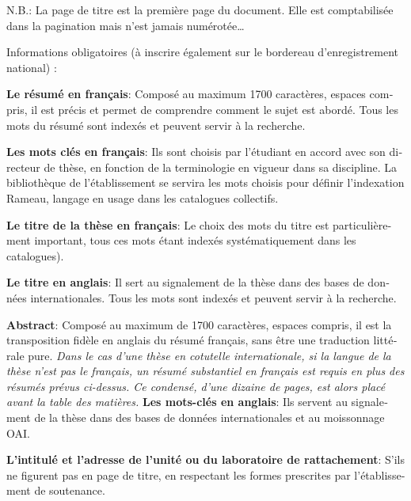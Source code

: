 \begin{otherlanguage}{french}
N.B.: La page de titre est la première page du document. 
Elle est comptabilisée dans la pagination mais n'est jamais numérotée\ldots


Informations obligatoires (à inscrire également sur le bordereau d’enregistrement national) :


\textbf{Le résumé en français}: Composé au maximum 1700 caractères, espaces compris, il est précis et permet de comprendre comment le sujet est abordé. Tous les mots du résumé sont indexés et peuvent servir à la recherche.

\textbf{Les mots clés en français}: Ils sont choisis par l’étudiant en accord avec son directeur de thèse, en fonction de la terminologie en vigueur dans sa discipline. La bibliothèque de l’établissement se servira les mots choisis pour définir l’indexation Rameau, langage en usage dans les catalogues collectifs.

\textbf{Le titre de la thèse en français}:
Le choix des mots du titre est particulièrement important, tous ces mots étant indexés systématiquement dans les catalogues).

\textbf{Le titre en anglais}:
Il sert au signalement de la thèse dans des bases de données internationales. Tous les mots sont indexés et peuvent servir à la recherche.

\textbf{Abstract}:
Composé au maximum de 1700 caractères, espaces compris, il est la transposition fidèle en anglais du résumé français, sans être une traduction littérale pure.
\emph{Dans le cas d’une thèse en cotutelle internationale, si la langue de la thèse n’est pas le français, un résumé substantiel en français est requis en plus des résumés prévus ci-dessus. Ce condensé, d'une dizaine de pages, est alors placé avant la table des matières.
}
\textbf{Les mots-clés en anglais}:
Ils servent au signalement de la thèse dans des bases de données internationales et au moissonnage OAI\@.

\textbf{L’intitulé et l'adresse de l'unité ou du laboratoire de rattachement}:
S’ils ne figurent pas en page de titre, en respectant les formes prescrites par l’établissement de soutenance.
\end{otherlanguage}